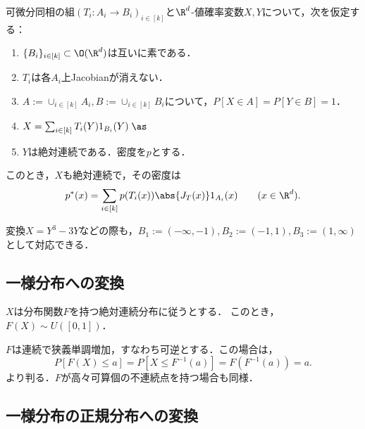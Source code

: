 \documentclass[uplatex,dvipdfmx]{jsreport}
\begin{document}
\begin{proposition}\label{prop-transformation-of-density-through-change-of-variable}
    可微分同相の組$(T_i:A_i\to B_i)_{i\in[k]}$と$\R^d$-値確率変数$X,Y$について，次を仮定する：
    \begin{enumerate}[({A}1)]
        \item $\{B_i\}_{i\in[k]}\subset\O(\R^d)$は互いに素である．
        \item $T_i$は各$A_i$上Jacobianが消えない．
        \item $A:=\cup_{i\in[k]}A_i,B:=\cup_{i\in[k]}B_i$について，$P[X\in A]=P[Y\in B]=1$．
        \item $X=\sum_{i\in[k]}T_i(Y)1_{B_i}(Y)\;\as$
        \item $Y$は絶対連続である．密度を$p$とする．
    \end{enumerate}
    このとき，$X$も絶対連続で，その密度は
    \[p^*(x)=\sum_{i\in[k]}p(T_i(x))\abs{J_T(x)}1_{A_i}(x)\qquad(x\in\R^d).\]
\end{proposition}
\begin{example}
    変換$X=Y^3-3Y$などの際も，$B_1:=(-\infty,-1),B_2:=(-1,1),B_3:=(1,\infty)$として対応できる．
\end{example}

\subsection{一様分布への変換}

\begin{proposition}
    $X$は分布関数$F$を持つ絶対連続分布に従うとする．
    このとき，$F(X)\sim U([0,1])$．
\end{proposition}
\begin{Proof}
    $F$は連続で狭義単調増加，すなわち可逆とする．この場合は，
    \[P[F(X)\le a]=P[X\le F^{-1}(a)]=F(F^{-1}(a))=a.\]
    より判る．$F$が高々可算個の不連続点を持つ場合も同様．
\end{Proof}

\subsection{一様分布の正規分布への変換}
\end{document}
